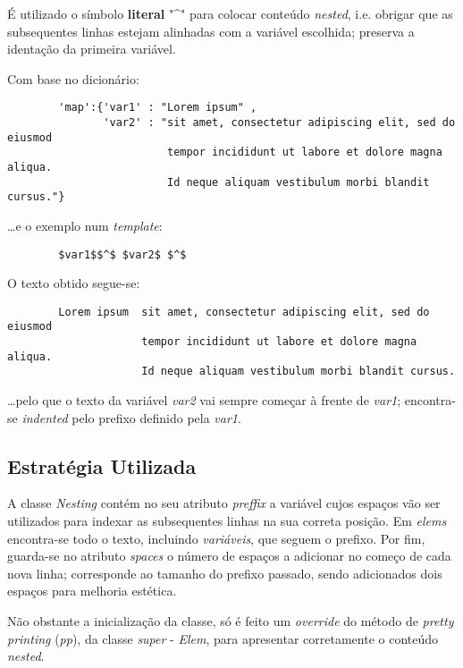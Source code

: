 \documentclass[../relatorio.tex]{subfiles}
\begin{document}
    É utilizado o símbolo \textbf{literal} "\^{}" para 
    colocar conteúdo \textit{nested}, i.e. obrigar que
    as subsequentes linhas estejam alinhadas com a variável 
    escolhida; preserva a identação da primeira variável.

    Com base no dicionário:

    \begin{verbatim}
        'map':{'var1' : "Lorem ipsum" , 
               'var2' : "sit amet, consectetur adipiscing elit, sed do eiusmod
                         tempor incididunt ut labore et dolore magna aliqua. 
                         Id neque aliquam vestibulum morbi blandit cursus."}
    \end{verbatim}

    \dots e o exemplo num \textit{template}:

    \begin{verbatim}
        $var1$$^$ $var2$ $^$
    \end{verbatim}
                           
    O texto obtido segue-se:
    \begin{verbatim}
        Lorem ipsum  sit amet, consectetur adipiscing elit, sed do eiusmod
                     tempor incididunt ut labore et dolore magna aliqua. 
                     Id neque aliquam vestibulum morbi blandit cursus.
    \end{verbatim}

    \dots pelo que o texto da variável \textit{var2} vai sempre começar 
    à frente de \textit{var1}; encontra-se \textit{indented} pelo prefixo 
    definido pela \textit{var1}.
    
    \subsection{Estratégia Utilizada}
    
    A classe \textit{Nesting} contém no seu atributo \textit{preffix} a 
    variável cujos espaços vão ser utilizados para indexar as subsequentes
    linhas na sua correta posição.
    Em \textit{elems} encontra-se todo o texto, incluindo \textit{variáveis},
    que seguem o prefixo.
    Por fim, guarda-se no atributo \textit{spaces} o número de espaços a adicionar
    no começo de cada nova linha; corresponde ao tamanho do prefixo passado,
    sendo adicionados dois espaços para melhoria estética.
    
    Não obstante a inicialização da classe, só é feito um \textit{override}
    do método de \textit{pretty printing} (\textit{pp}), da classe 
    \textit{super} - \textit{Elem}, para apresentar corretamente 
    o conteúdo \textit{nested}.
    
\end{document}
